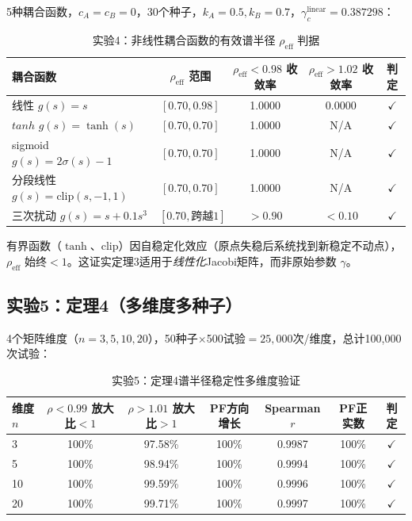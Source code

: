 \documentclass[12pt,a4paper]{article}
\theoremstyle{definition}
\begin{document}
5种耦合函数，$c_A=c_B=0$，30个种子，$k_A=0.5, k_B=0.7$，$\gamma_c^{\mathrm{linear}} = 0.387298$：

\begin{table}[htbp]
\centering
\caption{实验4：非线性耦合函数的有效谱半径 $\rho_{\mathrm{eff}}$ 判据}
\label{tab:exp4}
\begin{tabular}{lcccc}
\toprule
耦合函数 & $\rho_{\mathrm{eff}}$ 范围 & $\rho_{\mathrm{eff}} < 0.98$ 收敛率 & $\rho_{\mathrm{eff}} > 1.02$ 收敛率 & 判定 \\
\midrule
线性 $g(s)=s$ & $[0.70, 0.98]$ & 1.0000 & 0.0000 & $\checkmark$ \\
$tanh$ $g(s)=\tanh(s)$ & $[0.70, 0.70]$ & 1.0000 & N/A & $\checkmark$ \\
sigmoid $g(s)=2\sigma(s)-1$ & $[0.70, 0.70]$ & 1.0000 & N/A & $\checkmark$ \\
分段线性 $g(s)=\mathrm{clip}(s,-1,1)$ & $[0.70, 0.70]$ & 1.0000 & N/A & $\checkmark$ \\
三次扰动 $g(s)=s+0.1s^3$ & $[0.70, \text{跨越}1]$ & $>0.90$ & $<0.10$ & $\checkmark$ \\
\bottomrule
\end{tabular}
\end{table}

有界函数（$\tanh$、clip）因自稳定化效应（原点失稳后系统找到新稳定不动点），$\rho_{\mathrm{eff}}$ 始终$<1$。这证实定理3适用于\emph{线性化}Jacobi矩阵，而非原始参数 $\gamma$。

\subsection{实验5：定理4（多维度多种子）}

4个矩阵维度（$n = 3, 5, 10, 20$），50种子$\times$500试验$= 25{,}000$次/维度，总计100,000次试验：

\begin{table}[htbp]
\centering
\caption{实验5：定理4谱半径稳定性多维度验证}
\label{tab:exp5}
\begin{tabular}{lcccccc}
\toprule
维度 $n$ & $\rho<0.99$ 放大比$<1$ & $\rho>1.01$ 放大比$>1$ & PF方向增长 & Spearman $r$ & PF正实数 & 判定 \\
\midrule
3 & 100\% & 97.58\% & 100\% & 0.9987 & 100\% & $\checkmark$ \\
5 & 100\% & 98.94\% & 100\% & 0.9994 & 100\% & $\checkmark$ \\
10 & 100\% & 99.59\% & 100\% & 0.9996 & 100\% & $\checkmark$ \\
20 & 100\% & 99.71\% & 100\% & 0.9997 & 100\% & $\checkmark$ \\
\bottomrule
\end{tabular}
\end{table}
\end{document}
